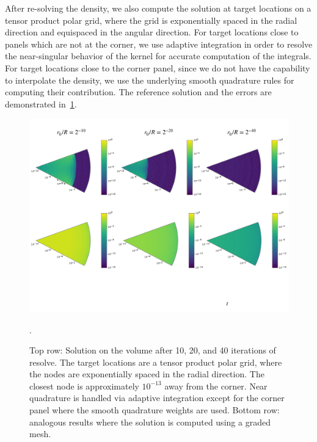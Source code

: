 After re-solving the density, we also compute the solution at target locations on a tensor product polar grid, where the grid
is exponentially spaced in the radial direction and equispaced in the angular direction. For target locations
close to panels which are not at the corner, we use adaptive integration in order to resolve the near-singular behavior of
the kernel for accurate computation of the integrals. For target locations close to the corner panel, since we do not have
the capability to interpolate the density, we use the underlying smooth quadrature rules for computing their contribution. 
The reference solution and the errors are demonstrated in~\cref{fig:vol-plot}.
\begin{figure}
\begin{center}
\includegraphics[width=\linewidth]{media/volume}
\caption{Top row: Solution on the volume after 10, 20, and 40 iterations of resolve. The target locations are a tensor product polar grid, where the nodes are exponentially spaced in the radial direction. The closest node is approximately $10^{-13}$ away from the corner. Near quadrature is handled via adaptive integration except for the corner panel where the smooth quadrature weights are used. Bottom row: analogous results where the solution is computed using a graded mesh.   }.
\end{center}
\label{fig:vol-plot}
\end{figure}


